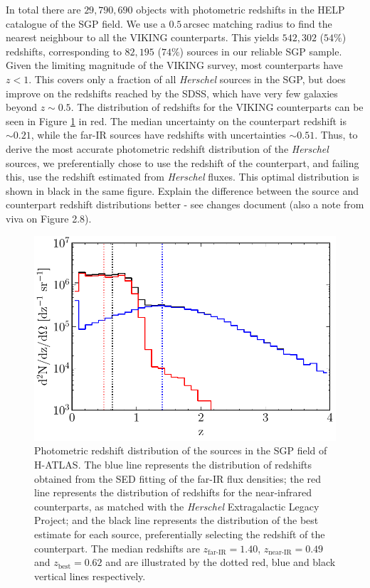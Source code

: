 In total there are $29,790,690$ objects with photometric redshifts in the HELP catalogue of the SGP field. We use a $0.5\,$arcsec matching radius to find the nearest neighbour to all the VIKING counterparts. This yields $542,302$ ($54\%$) redshifts, corresponding to $82,195$ ($74\%$) sources in our reliable SGP sample. Given the limiting magnitude of the VIKING survey, most counterparts have $z < 1$. This covers only a fraction of all \textit{Herschel} sources in the SGP, but does improve on the redshifts reached by the SDSS, which have very few galaxies beyond $z \sim 0.5$. The distribution of redshifts for the VIKING counterparts can be seen in Figure \ref{fig:redshift_distribution} in red. The median uncertainty on the counterpart redshift is $\sim 0.21$, while the far-IR sources have redshifts with uncertainties $\sim 0.51$. Thus, to derive the most accurate photometric redshift distribution of the \textit{Herschel} sources, we preferentially chose to use the redshift of the counterpart, and failing this, use the redshift estimated from \textit{Herschel} fluxes. This optimal distribution is shown in black in the same figure. {\color{red}Explain the difference between the source and counterpart redshift distributions better - see changes document (also a note from viva on Figure 2.8).}

\begin{figure}
    \centering
    \includegraphics[width=0.8\columnwidth]{Figures/redshift_distribution.pdf}
    \caption[Photometric redshift distribution of SGP sources]{Photometric redshift distribution of the sources in the SGP field of H-ATLAS. The blue line represents the distribution of redshifts obtained from the SED fitting of the far-IR flux densities; the red line represents the distribution of redshifts for the near-infrared counterparts, as matched with the \textit{Herschel} Extragalactic Legacy Project; and the black line represents the distribution of the best estimate for each source, preferentially selecting the redshift of the counterpart. The median redshifts are $z_{\textrm{far-IR}} = 1.40$, $z_{\textrm{near-IR}} = 0.49$ and $z_{\textrm{best}} = 0.62$ and are illustrated by the dotted red, blue and black vertical lines respectively.}
    \label{fig:redshift_distribution}
\end{figure}

